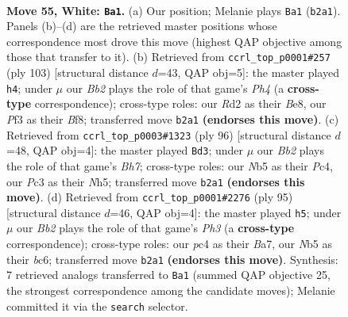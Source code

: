 \documentclass[11pt]{article}
\begin{document}
\clearpage

\begin{figure}[p]\centering
\begin{subfigure}{0.46\textwidth}\centering
\resizebox{\linewidth}{!}{%
\newchessgame
\chessboard[
  setfen={8/4p1k1/npr3pp/pN6/P1p2K2/2P2P2/1B1R4/8 w - - 4 55},
  showmover=false,
  pgfstyle=straightmove, color=movearrow, markmove={b2-a1}
]}
\caption{}
\end{subfigure}\hfill
\begin{subfigure}{0.46\textwidth}\centering
\resizebox{\linewidth}{!}{%
\newchessgame
\chessboard[
  setfen={4bbk1/8/R7/2p1ppPp/2P2n2/PK3P2/1P6/3R4 b - - 2 52},
  showmover=false,
  pgfstyle=straightmove, color=movearrow, markmove={h5-h4}
]}
\caption{}
\end{subfigure}
\\[4pt]
\begin{subfigure}{0.46\textwidth}\centering
\resizebox{\linewidth}{!}{%
\newchessgame
\chessboard[
  setfen={5k2/5p1B/1pr4p/p6N/P1P2P1P/7P/6K1/8 w - - 0 49},
  showmover=false,
  pgfstyle=straightmove, color=movearrow, markmove={h7-d3}
]}
\caption{}
\end{subfigure}\hfill
\begin{subfigure}{0.46\textwidth}\centering
\resizebox{\linewidth}{!}{%
\newchessgame
\chessboard[
  setfen={8/b1p2p2/2B2k1p/3P2p1/2r5/1N1n1PP1/P3R2P/1K6 b - - 0 48},
  showmover=false,
  pgfstyle=straightmove, color=movearrow, markmove={h6-h5}
]}
\caption{}
\end{subfigure}
\caption{\textbf{Move 55, White: \texttt{Ba1}.} (a) Our position; Melanie plays \texttt{Ba1} (\texttt{b2a1}). Panels (b)--(d) are the retrieved master positions whose correspondence most drove this move (highest QAP objective among those that transfer to it). (b) Retrieved from \texttt{ccrl\_top\_p0001\#257} (ply 103) [structural distance $d$=43, QAP obj=5]: the master played \texttt{h4}; under $\mu$ our \emph{Bb2} plays the role of that game's \emph{Ph4} (a \textbf{cross-type} correspondence); cross-type roles: our \emph{R}d2 as their \emph{B}e8, our \emph{P}f3 as their \emph{B}f8; transferred move \texttt{b2a1} \textbf{(endorses this move)}. (c) Retrieved from \texttt{ccrl\_top\_p0003\#1323} (ply 96) [structural distance $d$=48, QAP obj=4]: the master played \texttt{Bd3}; under $\mu$ our \emph{Bb2} plays the role of that game's \emph{Bh7}; cross-type roles: our \emph{N}b5 as their \emph{P}c4, our \emph{P}c3 as their \emph{N}h5; transferred move \texttt{b2a1} \textbf{(endorses this move)}. (d) Retrieved from \texttt{ccrl\_top\_p0001\#2276} (ply 95) [structural distance $d$=46, QAP obj=4]: the master played \texttt{h5}; under $\mu$ our \emph{Bb2} plays the role of that game's \emph{Ph3} (a \textbf{cross-type} correspondence); cross-type roles: our \emph{p}c4 as their \emph{B}a7, our \emph{N}b5 as their \emph{b}c6; transferred move \texttt{b2a1} \textbf{(endorses this move)}. Synthesis: 7 retrieved analogs transferred to \texttt{Ba1} (summed QAP objective 25, the strongest correspondence among the candidate moves); Melanie committed it via the \texttt{search} selector.}
\label{fig:thought-m108}
\end{figure}
\end{document}
